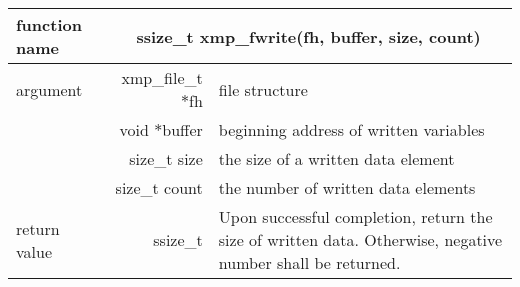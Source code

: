    \begin{table}[h]
    \begin{center}
     \begin{tabular}{|l|r|p{80mm}|}
      \hline
      {\bf function name}  & \multicolumn{2}{c|}{\bf ssize\_t
      xmp\_fwrite(fh, buffer, size, count)} \\ \hline \hline
      argument & xmp\_file\_t $*$fh & file structure \\ \cline{2-3}
      & void $*$buffer & beginning address of written variables \\ \cline{2-3}
      & size\_t size & the size of a written data element \\ \cline{2-3}
      & size\_t count & the number of written data elements \\ \hline
      return value & ssize\_t & Upon successful completion, return the size
	      of written data. Otherwise, negative number shall be
	      returned. \\ \hline
      \end{tabular}
     \end{center}
    \label{tb:aaa}
   \end{table}

   
